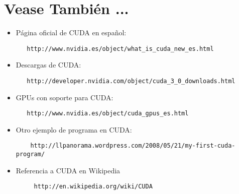 \section{Vease También ...}
\begin{itemize}
 \item Página oficial de CUDA en español:
  \begin{verbatim}
   http://www.nvidia.es/object/what_is_cuda_new_es.html
  \end{verbatim}
 \item Descargas de CUDA:
  \begin{verbatim}
   http://developer.nvidia.com/object/cuda_3_0_downloads.html
  \end{verbatim}
 \item GPUs con soporte para CUDA:
  \begin{verbatim}
   http://www.nvidia.es/object/cuda_gpus_es.html
  \end{verbatim}
\item Otro ejemplo de programa en CUDA:
  \begin{verbatim}
    http://llpanorama.wordpress.com/2008/05/21/my-first-cuda-program/
  \end{verbatim}
 \item Referencia a CUDA en Wikipedia
   \begin{verbatim}
     http://en.wikipedia.org/wiki/CUDA
     \end{verbatim}
\end{itemize}


